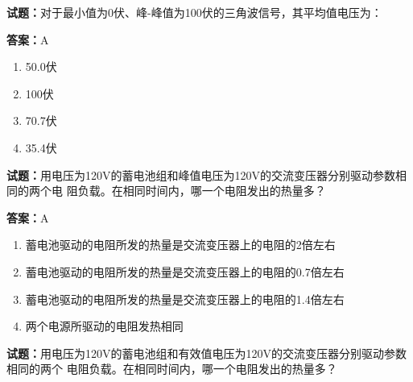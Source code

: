 \documentclass{ctexbook}
\begin{document}




\vspace{1em}

\textbf{试题：}对于最小值为0伏、峰-峰值为100伏的三角波信号，其平均值电压为： 

\textbf{答案：}A 

\begin{enumerate}[leftmargin=3em]
  \item 50.0伏 

  \item 100伏 

  \item 70.7伏 

  \item 35.4伏 

\end{enumerate}





\vspace{1em}

\textbf{试题：}用电压为120V的蓄电池组和峰值电压为120V的交流变压器分别驱动参数相同的两个电
阻负载。在相同时间内，哪一个电阻发出的热量多？ 

\textbf{答案：}A 

\begin{enumerate}[leftmargin=3em]
  \item 蓄电池驱动的电阻所发的热量是交流变压器上的电阻的2倍左右 

  \item 蓄电池驱动的电阻所发的热量是交流变压器上的电阻的0.7倍左右 

  \item 蓄电池驱动的电阻所发的热量是交流变压器上的电阻的1.4倍左右 

  \item 两个电源所驱动的电阻发热相同 

\end{enumerate}





\vspace{1em}

\textbf{试题：}用电压为120V的蓄电池组和有效值电压为120V的交流变压器分别驱动参数相同的两个
电阻负载。在相同时间内，哪一个电阻发出的热量多？ 
\end{document}
